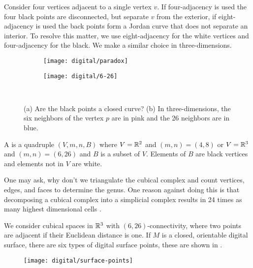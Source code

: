Consider four vertices adjacent to a single vertex $v$.
If four-adjacency is used the four black points are disconnected,
but separate $v$ from the exterior, if eight-adjacency is used
the back points form a Jordan curve that does not separate
an interior. To resolve this matter, we use eight-adjacency
for the white vertices and four-adjacency for the black.
We make a similar choice in three-dimensions.

\begin{figure}[htb]
        \centering
        \begin{subfigure}[b]{0.35\textwidth}
        \texttt{[image: digital/paradox]}
        \caption{}
          \label{fig:paradox}
        \end{subfigure}
          \hspace{.0cm}
         \begin{subfigure}[b]{0.40\textwidth}
        \texttt{[image: digital/6-26]}
        \caption{}
        \label{fig:6-26}
        \end{subfigure}\\
		\caption{(a) Are the black points a closed curve? (b) In three-dimensions,
		the six neighbors of the vertex $p$ are in pink and the 26 neighbors are in
		blue. 
		\label{fig:adjacency}}
\end{figure}

A  is a quadruple $(V,m,n,B)$ where
$V=\mathbb{R}^2$ and $(m,n)=(4,8)$ or $V=\mathbb{R}^3$ and $(m,n)=(6,26)$
and $B$ is a subset of $V$. Elements of $B$ are black vertices
and elements not in $V$ are white.


One may ask, why don't we triangulate the cubical complex and
count vertices, edges, and faces to determine the genus.
One reason against doing this is that 
decomposing a cubical complex into a simplicial complex
results in 24 times as many highest dimensional cells \cite{Kaczynski2003}.


We consider cubical spaces in $\mathbb{R}^3$ with $(6,26)$-connectivity,
where two points are adjacent if their Euclidean distance is one.
If $M$ is a closed, orientable digital surface, there are
six types of digital surface points, these are shown in .

\begin{figure}[htb]
        \centering
        \texttt{[image: digital/surface-points]}
		\caption{
		\label{fig:surface-points}}
\end{figure}

